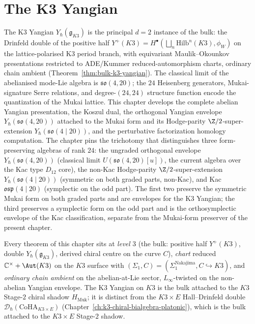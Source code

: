 \chapter{The K3 Yangian}
\label{ch:k3-yangian}

The K3 Yangian $Y_\hbar(\mathfrak{g}_{K3})$ is the principal $d = 2$
instance of the bulk: the Drinfeld double of the positive half
$Y^{+}(K3) = H^{\bullet}(\bigsqcup_n \mathrm{Hilb}^n(K3),
\phi_W)$ on the lattice-polarised K3 period branch, with equivariant
Maulik--Okounkov presentations restricted to ADE/Kummer reduced-automorphism
charts, ordinary chain ambient (Theorem~\ref{thm:bulk-k3-yangian}). The
classical limit of the abelianised mode-Lie algebra is
$\mathfrak{so}(4, 20)$; the $24$ Heisenberg generators,
Mukai-signature Serre relations, and degree-$(24, 24)$ structure
function encode the quantization of the Mukai lattice. This chapter
develops the complete abelian Yangian presentation, the Koszul dual,
the orthogonal Yangian envelope $Y_\hbar(\mathfrak{so}(4, 20))$
attached to the Mukai form and its Hodge-parity
$\Z/2$-super-extension $Y_\hbar(\mathfrak{so}(4 \mid 20))$, and the
perturbative factorization homology computation. The chapter pins the
trichotomy that distinguishes three form-preserving algebras of rank
$24$: the ungraded orthogonal envelope
$Y_\hbar(\mathfrak{so}(4, 20))$ (classical limit
$U(\mathfrak{so}(4, 20)[u])$, the current algebra over the Kac type
$D_{12}$ core), the non-Kac
Hodge-parity $\Z/2$-super-extension
$Y_\hbar(\mathfrak{so}(4 \mid 20))$ (symmetric on both graded parts,
non-Kac), and Kac $\mathfrak{osp}(4 \mid 20)$ (symplectic on the odd
part). The first two preserve the symmetric Mukai form on both
graded parts and are envelopes for the K3 Yangian; the third
preserves a symplectic form on the odd part and is the
orthosymplectic envelope of the Kac classification, separate from
the Mukai-form preserver of the present chapter.

\begin{remark}
\label{rem:k3-yangian-three-axis-coords}
Every theorem of this chapter sits at \emph{level $3$} (the bulk:
positive half $Y^{+}(K3)$, double $Y_\hbar(\mathfrak g_{K3})$, derived
chiral centre on the curve $C$), \emph{chart} reduced
$\mathbb C^{\times} + \Aut(K3)$ on the $K3$ surface with
$(\Sigma_1, C) = (\Sigma_1^{\mathrm{Nakajima}}, C \hookrightarrow K3)$,
and \emph{ordinary chain ambient} on the abelian-at-Lie sector,
$L_\infty$-twisted on the non-abelian Yangian envelope. The K3
Yangian on $K3$ is the bulk attached to the $K3$ Stage-$2$ chiral
shadow $H_{\mathrm{Muk}}$; it is distinct from the
$K3 \times E$ Hall--Drinfeld double $\mathcal D_\hbar(\mathrm{CoHA}_{K3
\times E})$ (Chapter~\ref{ch:k3-chiral-bialgebra-platonic}), which is
the bulk attached to the $K3 \times E$ Stage-$2$ shadow.
\end{remark}

